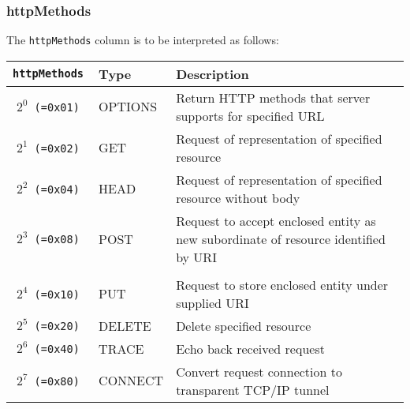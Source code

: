 \documentclass[documentation]{subfiles}
\begin{document}
\subsubsection{httpMethods}\label{httpMethods}
The {\tt httpMethods} column is to be interpreted as follows:
\begin{longtable}{>{\tt}rll}
    \toprule
    {\bf httpMethods} & {\bf Type} & {\bf Description}\\
    \midrule\endhead%
    $2^0$ (=0x01)     & OPTIONS    & Return HTTP methods that server supports for specified URL\\
    $2^1$ (=0x02)     & GET        & Request of representation of specified resource\\
    $2^2$ (=0x04)     & HEAD       & Request of representation of specified resource without body\\
    $2^3$ (=0x08)     & POST       & Request to accept enclosed entity as new subordinate of resource identified by URI\\
    \\
    $2^4$ (=0x10)     & PUT        & Request to store enclosed entity under supplied URI\\
    $2^5$ (=0x20)     & DELETE     & Delete specified resource\\
    $2^6$ (=0x40)     & TRACE      & Echo back received request\\
    $2^7$ (=0x80)     & CONNECT    & Convert request connection to transparent TCP/IP tunnel \\
    \bottomrule
\end{longtable}
\end{document}
